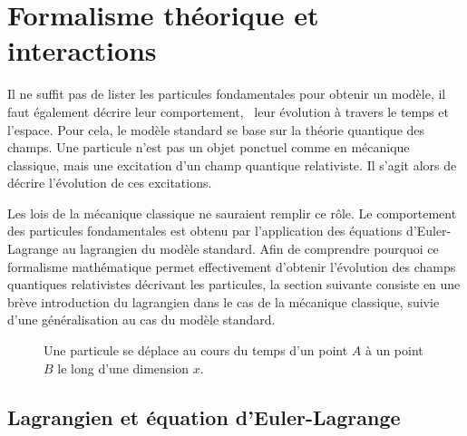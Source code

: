 \section{Formalisme théorique et interactions}\label{chapter-MS-MSSM-section-formalisme}
Il ne suffit pas de lister les particules fondamentales pour obtenir un modèle, il faut également décrire leur comportement, \ie\ leur évolution à travers le temps et l'espace.
Pour cela, le modèle standard se base sur la théorie quantique des champs. Une particule n'est pas un \og objet ponctuel \fg{} comme en mécanique classique, mais une excitation d'un champ quantique relativiste. Il s'agit alors de décrire l'évolution de ces excitations.
\par Les lois de la mécanique classique ne sauraient remplir ce rôle.
Le comportement des particules fondamentales est obtenu par l'application des équations d'Euler-Lagrange au lagrangien du modèle standard.
Afin de comprendre pourquoi ce formalisme mathématique permet effectivement d'obtenir l'évolution des champs quantiques relativistes décrivant les particules, la section suivante consiste en une brève introduction du lagrangien dans le cas de la mécanique classique, suivie d'une généralisation au cas du modèle standard.
\begin{wrapfigure}{R}{7cm}
\centering
{}
\caption{Une particule se déplace au cours du temps d'un point $A$ à un point $B$ le long d'une dimension $x$.}
\label{fig-ptc_classique_ptA_to_pt_B}
\end{wrapfigure}
\subsection{Lagrangien et équation d'Euler-Lagrange}\label{chapter-MS-MSSM-section-formalisme-subsec-into_lagrangien}
